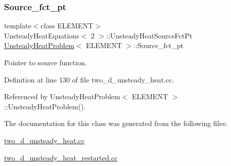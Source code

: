 \mbox{\label{classUnsteadyHeatProblem_a923d1a0bd45b1cd747a5b4558ae3f190}} 
\subsubsection{\texorpdfstring{Source\+\_\+fct\+\_\+pt}{Source\_fct\_pt}}
{\footnotesize\ttfamily template$<$class E\+L\+E\+M\+E\+NT$>$ \\
Unsteady\+Heat\+Equations$<$ 2 $>$\+::Unsteady\+Heat\+Source\+Fct\+Pt \hyperlink{classUnsteadyHeatProblem}{Unsteady\+Heat\+Problem}$<$ E\+L\+E\+M\+E\+NT $>$\+::Source\+\_\+fct\+\_\+pt\hspace{0.3cm}{\ttfamily [private]}}



Pointer to source function. 



Definition at line 130 of file two\+\_\+d\+\_\+unsteady\+\_\+heat.\+cc.



Referenced by Unsteady\+Heat\+Problem$<$ E\+L\+E\+M\+E\+N\+T $>$\+::\+Unsteady\+Heat\+Problem().



The documentation for this class was generated from the following files\+:\begin{DoxyCompactItemize}
\item 
\hyperlink{two__d__unsteady__heat_8cc}{two\+\_\+d\+\_\+unsteady\+\_\+heat.\+cc}\item 
\hyperlink{two__d__unsteady__heat__restarted_8cc}{two\+\_\+d\+\_\+unsteady\+\_\+heat\+\_\+restarted.\+cc}\end{DoxyCompactItemize}
